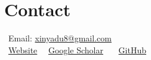 \section{Contact}

\noindent \faEnvelope\ Email: 
\href{mailto:xinyadu8@gmail.com}{{xinyadu8@gmail.com}} \\
\noindent \faGlobe\  \href{https://xinyadu.github.io}{Website} \ \
\faGraduationCap \href{https://scholar.google.com/citations?user=R-lKQqkAAAAJ&hl=en}{Google Scholar} \ \
\faGithub\ \href{https://github.com/xinyadu}{GitHub}
